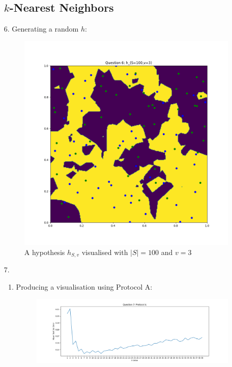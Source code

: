 \documentclass[12pt]{article}
\begin{document}
\begin{enumerate}[leftmargin=\labelsep]
\subsection{$k$-Nearest Neighbors}
\item[6.]Generating a random $h$:
            \begin{figure}[h]
            \centering
            \includegraphics[scale=0.5]{outputs/q6/q6}
            \caption{A hypothesis $h_{S,v}$ visualised with $|S|=100$ and $v=3$}
            \label{fig:6a}
            \end{figure}
\newpage
\item[7.]
    \begin{enumerate}
        \item Producing a visualisation using Protocol A:
            \begin{figure}[h]
            \centering
            \includegraphics[scale=0.5]{outputs/q7/q7}

\end{figure}
\end{enumerate}
\end{enumerate}
\end{document}
